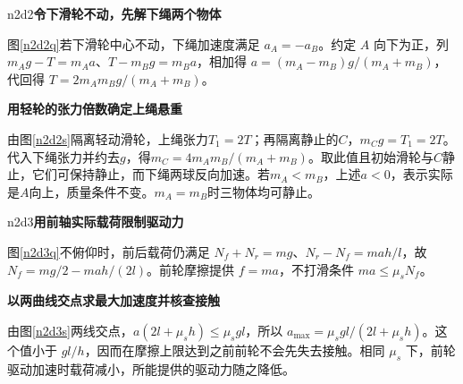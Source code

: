\begin{drillsolution}{n2d2}\textbf{令下滑轮不动，先解下绳两个物体}\par\nobreak
图\ref{n2d2q}若下滑轮中心不动，下绳加速度满足 $a_A=-a_B$。约定 $A$ 向下为正，列 $m_Ag-T=m_Aa$、$T-m_Bg=m_Ba$，相加得 $a=(m_A-m_B)g/(m_A+m_B)$，代回得 $T=2m_Am_Bg/(m_A+m_B)$。


\par\medskip{}\noindent\textbf{用轻轮的张力倍数确定上绳悬重}\par\nobreak
由图\ref{n2d2s}隔离轻动滑轮，上绳张力$T_1=2T$；再隔离静止的$C$，$m_Cg=T_1=2T$。代入下绳张力并约去$g$，得$m_C=4m_Am_B/(m_A+m_B)$。取此值且初始滑轮与$C$静止，它们可保持静止，而下绳两球反向加速。若$m_A<m_B$，上述$a<0$，表示实际是$A$向上，质量条件不变。$m_A=m_B$时三物体均可静止。
\end{drillsolution}

\begin{drillsolution}{n2d3}\textbf{用前轴实际载荷限制驱动力}\par\nobreak
图\ref{n2d3q}不俯仰时，前后载荷仍满足 $N_f+N_r=mg$、$N_r-N_f=mah/l$，故 $N_f=mg/2-mah/(2l)$。前轮摩擦提供 $f=ma$，不打滑条件 $ma\le\mu_sN_f$。


\par\medskip{}\noindent\textbf{以两曲线交点求最大加速度并核查接触}\par\nobreak
由图\ref{n2d3s}两线交点，$a(2l+\mu_sh)\le\mu_sgl$，所以 $a_{\max}=\mu_sgl/(2l+\mu_sh)$。这个值小于 $gl/h$，因而在摩擦上限达到之前前轮不会先失去接触。相同 $\mu_s$ 下，前轮驱动加速时载荷减小，所能提供的驱动力随之降低。
\end{drillsolution}


